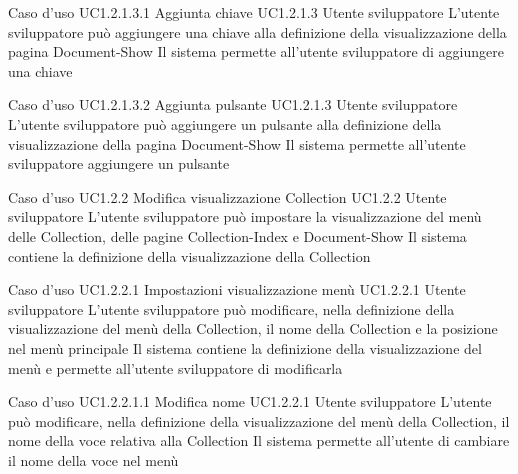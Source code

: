 \UCtitle
{Caso d'uso UC1.2.1.3.1}
{Aggiunta chiave}
\UC
{UC1.2.1.3}
{Utente sviluppatore}
{L'utente sviluppatore  può aggiungere una chiave alla definizione della visualizzazione della pagina Document-Show}
{Il sistema permette all'utente sviluppatore di aggiungere una chiave}

\UCtitle
{Caso d'uso UC1.2.1.3.2}
{Aggiunta pulsante}
\UC
{UC1.2.1.3}
{Utente sviluppatore}
{L'utente sviluppatore  può aggiungere un pulsante alla definizione della visualizzazione della pagina Document-Show}
{Il sistema permette all'utente sviluppatore aggiungere un pulsante}


\UCtitle
{Caso d'uso UC1.2.2}
{Modifica visualizzazione Collection}
\UC
{UC1.2.2}
{Utente sviluppatore}
{L'utente sviluppatore  può impostare la visualizzazione del menù delle Collection, delle pagine Collection-Index e Document-Show}
{Il sistema contiene la definizione della visualizzazione della Collection}

\UCtitle
{Caso d'uso UC1.2.2.1}
{Impostazioni visualizzazione menù}
\UC
{UC1.2.2.1}
{Utente sviluppatore}
{L'utente sviluppatore può modificare, nella definizione della visualizzazione del menù della Collection, il nome della Collection e la posizione nel menù principale}
{Il sistema contiene la definizione della visualizzazione del menù e permette all'utente sviluppatore di modificarla}


\UCtitle
{Caso d'uso UC1.2.2.1.1}
{Modifica nome}
\UC
{UC1.2.2.1}
{Utente sviluppatore}
{L'utente può modificare, nella definizione della visualizzazione del menù della Collection, il nome della voce relativa alla Collection}
{Il sistema permette all'utente di cambiare il nome della voce nel menù}

